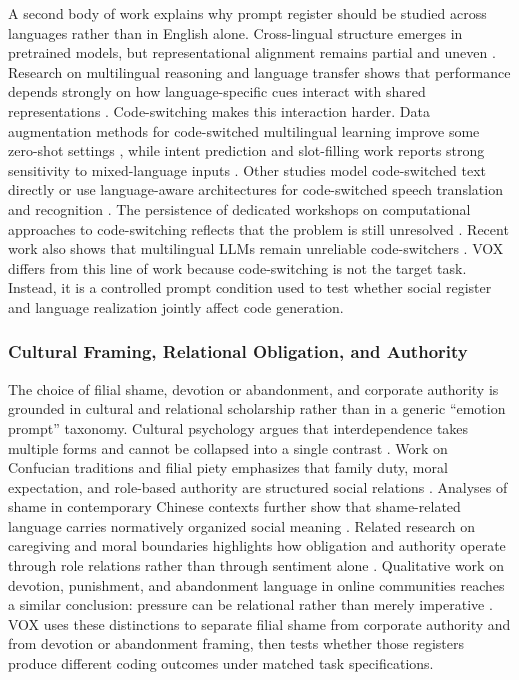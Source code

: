 \documentclass{article}
\begin{document}
\label{sec:multilingual_modeling_and_code_switching}

A second body of work explains why prompt register should be studied across languages rather than in English alone. Cross-lingual structure emerges in pretrained models, but representational alignment remains partial and uneven \cite{conneau2020emerging}. Research on multilingual reasoning and language transfer shows that performance depends strongly on how language-specific cues interact with shared representations \cite{foroutan2023breaking, khurana2022natural}. Code-switching makes this interaction harder. Data augmentation methods for code-switched multilingual learning improve some zero-shot settings \cite{qin2020cosdaml}, while intent prediction and slot-filling work reports strong sensitivity to mixed-language inputs \cite{krishnan2021multilingual}. Other studies model code-switched text directly \cite{lee2020modeling} or use language-aware architectures for code-switched speech translation and recognition \cite{weller2022endtoend, wang2024tristage}. The persistence of dedicated workshops on computational approaches to code-switching reflects that the problem is still unresolved \cite{kar2023proceedings}. Recent work also shows that multilingual LLMs remain unreliable code-switchers \cite{zhang2023multilingual}. VOX differs from this line of work because code-switching is not the target task. Instead, it is a controlled prompt condition used to test whether social register and language realization jointly affect code generation.

\subsubsection{Cultural Framing, Relational Obligation, and Authority}

\label{sec:cultural_framing_relational_obligation_a}

The choice of filial shame, devotion or abandonment, and corporate authority is grounded in cultural and relational scholarship rather than in a generic ``emotion prompt'' taxonomy. Cultural psychology argues that interdependence takes multiple forms and cannot be collapsed into a single contrast \cite{kitayama2022varieties}. Work on Confucian traditions and filial piety emphasizes that family duty, moral expectation, and role-based authority are structured social relations \cite{badanta2022confucianism, yuan2022confucian, li2021crosscultural}. Analyses of shame in contemporary Chinese contexts further show that shame-related language carries normatively organized social meaning \cite{tang2022cultural}. Related research on caregiving and moral boundaries highlights how obligation and authority operate through role relations rather than through sentiment alone \cite{chan2024confucian, pilnick2022reconsidering}. Qualitative work on devotion, punishment, and abandonment language in online communities reaches a similar conclusion: pressure can be relational rather than merely imperative \cite{tragantzopoulou2024alone}. VOX uses these distinctions to separate filial shame from corporate authority and from devotion or abandonment framing, then tests whether those registers produce different coding outcomes under matched task specifications.
\end{document}
